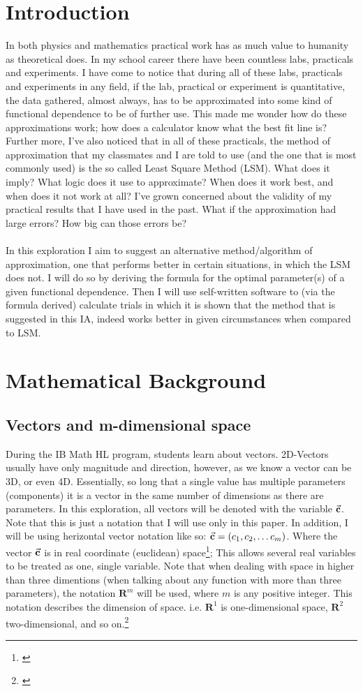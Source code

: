 \section{Introduction}
In both physics and mathematics practical work has as much value to humanity as theoretical does. In my school career there have been countless labs, practicals and experiments. I have come to notice that during all of these labs, practicals and experiments in any field, if the lab, practical or experiment is quantitative, the data gathered, almost always, has to be approximated into some kind of functional dependence to be of further use. This made me wonder how do these approximations work; how does a calculator know what the best fit line is? Further more, I've also noticed that in all of these practicals, the method of approximation that my classmates and I  are told to use (and the one that is most commonly used) is the so called Least Square Method (LSM). What does it imply? What logic does it use to approximate? When does it work best, and when does it not work at all? I've grown concerned about the validity of my practical results that I have used in the past. What if the approximation had large errors? How big can those errors be? \\
\\
In this exploration I aim to suggest an alternative method/algorithm of approximation, one that performs better in certain situations, in which the LSM does not. I will do so by deriving the formula for the optimal parameter(s) of a given functional dependence. Then I will use self-written software to (via the formula derived) calculate trials in which it is shown that the method that is suggested in this IA, indeed works better in given circumstances when compared to LSM. 
\section{Mathematical Background} \label{concepts}
\subsection{Vectors and m-dimensional space}

During the IB Math HL program, students learn about vectors. 2D-Vectors usually have only magnitude and direction, however, as we know a vector can be 3D, or even 4D. Essentially, so long that a single value has multiple parameters (components) it is a vector in the same number of dimensions as there are parameters. In this exploration, all vectors will be denoted with the variable $\vec{\textbf{c}}$. Note that this is just a notation that I will use only in this paper. In addition, I will be using herizontal vector notation like so: $\vec{\textbf{c}}=(c_{1},c_{2},\dots c_{m})$. Where the vector ${\vec{\textbf{c}}}$ is in real coordinate (euclidean) space\footnote{\cite{kelley_1995}}; This allows several real variables to be treated as one, single variable. Note that when dealing with space in higher than three dimentions (when talking about any function with more than three parameters), the notation $\boldsymbol{R}^{m}$ will be used, where $m$ is any positive integer. This notation describes the dimension of space. i.e. $\boldsymbol{R}^{1}$ is one-dimensional space, $\boldsymbol{R}^{2}$ two-dimensional, and so on.\footnote{\cite{Weisstein_2014}}
